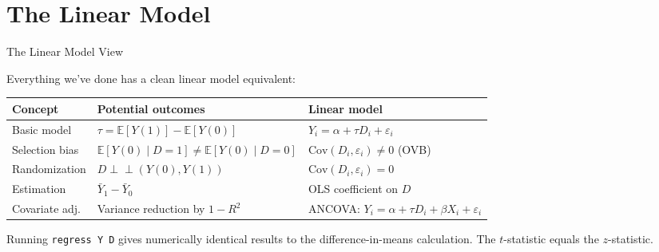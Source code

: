 \documentclass[aspectratio=169, 11pt, handout]{beamer}
\newcommand{\E}{\mathbb{E}}
\newcommand{\Cov}{\mathrm{Cov}}
\newcommand{\indep}{\perp\!\!\!\perp}
\begin{document}
\section{The Linear Model}

\begin{frame}{The Linear Model View}

Everything we've done has a clean linear model equivalent:

\bigskip

\begin{center}
\small
\begin{tabular}{lll}
\toprule
\textbf{Concept} & \textbf{Potential outcomes} & \textbf{Linear model} \\
\midrule
Basic model & $\tau = \E[Y(1)] - \E[Y(0)]$ & $Y_i = \alpha + \tau D_i + \varepsilon_i$ \\[0.4em]
Selection bias & $\E[Y(0) \mid D\!=\!1] \neq \E[Y(0) \mid D\!=\!0]$ & $\Cov(D_i, \varepsilon_i) \neq 0$ (OVB) \\[0.4em]
Randomization & $D \indep (Y(0), Y(1))$ & $\Cov(D_i, \varepsilon_i) = 0$ \\[0.4em]
Estimation & $\bar{Y}_1 - \bar{Y}_0$ & OLS coefficient on $D$ \\[0.4em]
Covariate adj. & Variance reduction by $1 - R^2$ & ANCOVA: $Y_i = \alpha + \tau D_i + \beta X_i + \varepsilon_i$ \\
\bottomrule
\end{tabular}
\end{center}

\bigskip

Running \texttt{regress Y D} gives numerically identical results to the difference-in-means calculation. The $t$-statistic equals the $z$-statistic.
\end{frame}
\end{document}
